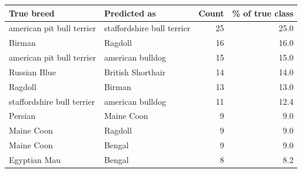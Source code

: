 \begin{tabular}{llrr}
\toprule
True breed & Predicted as & Count & \% of true class \\
\midrule
american pit bull terrier & staffordshire bull terrier & 25 & 25.0 \\
Birman & Ragdoll & 16 & 16.0 \\
american pit bull terrier & american bulldog & 15 & 15.0 \\
Russian Blue & British Shorthair & 14 & 14.0 \\
Ragdoll & Birman & 13 & 13.0 \\
staffordshire bull terrier & american bulldog & 11 & 12.4 \\
Persian & Maine Coon & 9 & 9.0 \\
Maine Coon & Ragdoll & 9 & 9.0 \\
Maine Coon & Bengal & 9 & 9.0 \\
Egyptian Mau & Bengal & 8 & 8.2 \\
\bottomrule
\end{tabular}